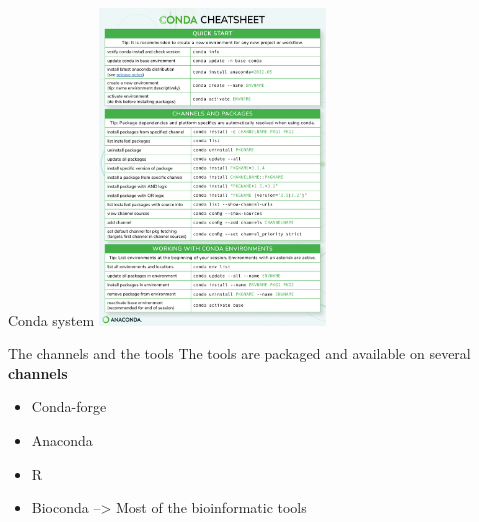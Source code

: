 \begin{frame}{Conda system}
\centering\includegraphics[width=0.45\textwidth]{conda_sheet_4.12.pdf}
\end{frame}
\begin{frame}{The channels and the tools}
The tools are packaged and available on several \textbf{channels}
\begin{minipage}[t]{0.48\linewidth}
\begin{itemize}[<2->]
\item Conda-forge
\item Anaconda
\end{itemize}
\end{minipage}
\begin{minipage}[t]{0.48\linewidth}
\begin{itemize}[<2->]
\item R
\item Bioconda --> Most of the bioinformatic tools
\end{itemize}
\end{minipage}
\end{frame}

